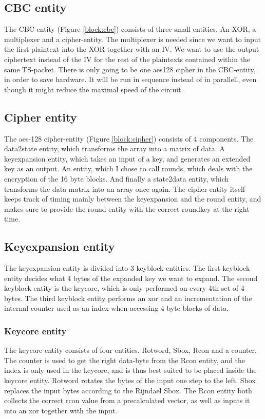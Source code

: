 \subsection{CBC entity}
The CBC-entity (Figure \ref{block:cbc}) consists of three small 
entities. An XOR, a multiplexer and a cipher-entity. The multiplexer is 
needed since we want to input the first plaintext into the XOR together 
with an IV. We want to use the output ciphertext instead of the IV for 
the rest of the plaintexts contained within the same TS-packet. There 
is only going to be one aes128 cipher in the CBC-entity, in order to 
save hardware. It will be run in sequence instead of in parallell, even 
though it might reduce the maximal speed of the circuit.

\subsection{Cipher entity}
The aes-128 cipher-entity (Figure \ref{block:cipher}) consists of 4 
components. The data2state entity, which transforms the array into a 
matrix of data. A keyexpansion entity, which takes an input of a key, 
and generates an extended key as an output. An entity, which I chose to 
call rounds, which deals with the encryption of the 16 byte blocks. And 
finally a state2data entity, which transforms the data-matrix into an 
array once again. The cipher entity itself keeps track of timing mainly 
between the keyexpansion and the round entity, and makes sure to 
provide the round entity with the correct roundkey at the right time.

\subsection{Keyexpansion entity}
The keyexpansion-entity is divided into 3 keyblock entities. The first 
keyblock entity decides what 4 bytes of the expanded key we want to 
expand. The second keyblock entity is the keycore, which is only 
performed on every 4th set of 4 bytes. The third keyblock entity 
performs an xor and an incrementation of the internal counter used as 
an index when accessing 4 byte blocks of data.

\subsubsection{Keycore entity}
The keycore entity consists of four entities. Rotword, Sbox, Rcon and a 
counter. The counter is used to get the right data-byte from the Rcon 
entity, and the index is only used in the keycore, and is thus best 
suited to be placed inside the keycore entity. Rotword rotates the 
bytes of the input one step to the left. Sbox replaces the input bytes 
according to the Rijndael Sbox. The Rcon entity both collects the 
correct rcon value from a precalculated vector, as well as inputs it 
into an xor together with the input.

